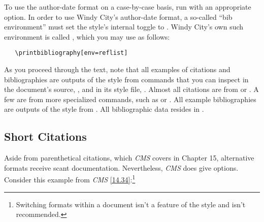 \documentclass[11pt,letterpaper,oneside]{article}
\begin{document}
To use the author-date format on a case-by-case basis, run
 with an appropriate  option. In order
to use Windy City's author-date format, a so-called ``bib
environment'' must set the style's internal  toggle to
. Windy City's own such environment is called ,
which you may use as follows:

\begin{verbatim}
   \printbibliography[env=reflist]
\end{verbatim}

As you proceed through the text, note that all examples of citations
and bibliographies are outputs of the style from commands that you can
inspect in the document's source, , and in its
style file, . Almost all citations are from
 or . A few are from more specialized
commands, such as  or . All example
bibliographies are outputs of the style from .
All bibliographic data resides in .

\subsection{Short Citations}
\label{short}

Aside from parenthetical citations, which \textit{CMS} covers in
Chapter 15, alternative formats receive scant documentation.
Nevertheless, \textit{CMS} does give options. Consider this example
from \textit{CMS} \ref{14.34}:\footnote{Switching formats within a
document isn't a feature of the style and isn't recommended.}

\begin{citeonly}
\item \cite[3]{morrison2004a}
\item \cite[18]{morrison2004a}
\item \cite[18]{morrison2004a}
\item \cite[24--26]{morrison2004a}
\item \cite[401-2]{morrison2004b}
\item \cite[433]{morrison2004b}
\item \cite[37--38]{diaz2008}
\item \cite[403]{morrison2004b}
\item \cite[152]{diaz2008}
\item \cite[201-2]{diaz2008}
\item \cites[240]{morrison2004b}[32]{morrison2004a}
\item \cite[33]{morrison2004a}
\end{citeonly}
\end{document}
